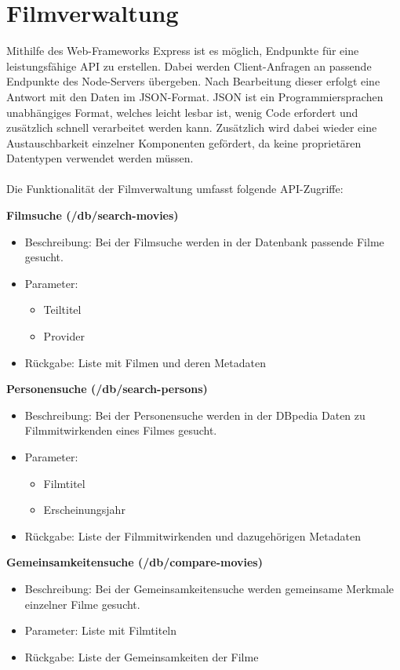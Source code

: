 \documentclass[conference]{IEEEtran}
\begin{document}
\section{Filmverwaltung}
Mithilfe des Web-Frameworks Express ist es möglich, Endpunkte für eine leistungsfähige API zu erstellen. Dabei
werden Client-Anfragen an passende Endpunkte des Node-Servers übergeben. Nach Bearbeitung dieser erfolgt eine Antwort
mit den Daten im JSON-Format. JSON ist ein Programmiersprachen unabhängiges Format, welches leicht lesbar ist, wenig Code erfordert
und zusätzlich schnell verarbeitet werden kann. Zusätzlich wird dabei wieder eine Austauschbarkeit einzelner Komponenten 
gefördert, da keine proprietären Datentypen verwendet werden müssen.
\\
\\
Die Funktionalität der Filmverwaltung umfasst folgende API-Zugriffe:
\smallskip

\textbf{Filmsuche (/db/search-movies)}
\begin{itemize}
\item Beschreibung:
    Bei der Filmsuche werden in der Datenbank passende Filme gesucht.
\item Parameter:
\begin{itemize}
    \item Teiltitel
    \item Provider
\end{itemize}
\item Rückgabe:
    Liste mit Filmen und deren Metadaten
\end{itemize}

\smallskip

\textbf{Personensuche (/db/search-persons)}
\begin{itemize}
\item Beschreibung:
    Bei der Personensuche werden in der DBpedia Daten zu Filmmitwirkenden eines Filmes gesucht.
\item Parameter:
    \begin{itemize}
    \item Filmtitel
    \item Erscheinungsjahr
    \end{itemize}
\item Rückgabe:
    Liste der Filmmitwirkenden und dazugehörigen Metadaten
\end{itemize}

\smallskip

\textbf{Gemeinsamkeitensuche (/db/compare-movies)}
\begin{itemize}
\item Beschreibung:
    Bei der Gemeinsamkeitensuche werden gemeinsame Merkmale einzelner Filme gesucht.
\item Parameter:
    Liste mit Filmtiteln
\item Rückgabe:
    Liste der Gemeinsamkeiten der Filme
\end{itemize}
\end{document}
